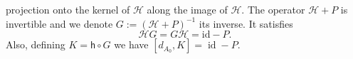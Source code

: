\documentclass[11pt,a4paper]{amsart}
\theoremstyle{plain} %
\theoremstyle{definition}
\theoremstyle{remark}
\newcommand{\mr}{\mathrm}
\newcommand{\sh}{\mathsf{h}}
\newcommand{\HHH}{\mathcal{H}}
\begin{document}
{projection onto the kernel of $\HHH$ along the image of $\HHH$. 
 The operator $\HHH + P$ is invertible and we denote $G:=(\HHH+P)^{-1}$ its inverse. It satisfies 
 \begin{equation}
     \HHH G = G \HHH = \mathrm{id} - P. 
 \end{equation}
Also, defining $K = \sh \circ G$ we have $[d_{A_0},K] = \operatorname{id} - P$. 

}
\end{document}
